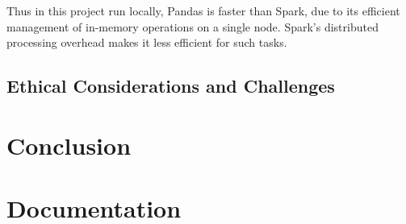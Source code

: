 \documentclass[12pt,oneside]{book} %
\begin{document}
Thus in this project run locally, Pandas is faster than Spark, due to its
efficient management of in-memory operations on a single node. Spark's
distributed processing overhead makes it less efficient for such tasks.

\newpage
\section{Ethical Considerations and Challenges}

\newpage
\chapter{Conclusion}




\appendix
\chapter{Documentation}
\end{document}
